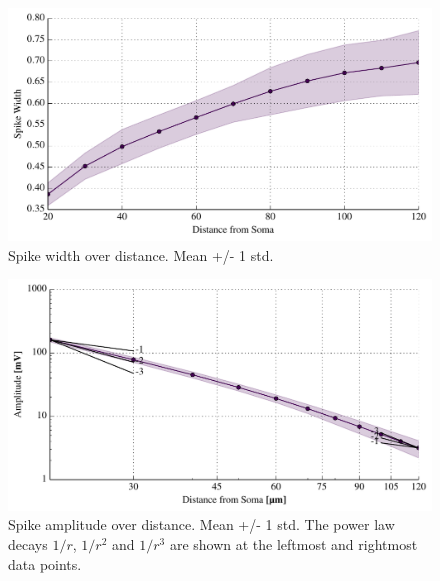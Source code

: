 \documentclass[altfont, fleqn]{uiophd}
\begin{document}
\begin{figure}[thp]
\centering
\includegraphics[width=\textwidth]{images/4_1/disc_spike_width_II.pdf}
\caption{Spike width over distance. Mean +/- 1 std.}
\label{fig:4_1_spike_width}
\end{figure}

\begin{figure}[thp]
    \centering
    \includegraphics[width=\textwidth]{images/4_1/disc_spike_amps_I_log.pdf}
    \caption{Spike amplitude over distance. Mean +/- 1 std. The power law
    decays $1/r$, $1/r^2$ and $1/r^3$ are shown at the leftmost and rightmost
    data points.}
    \label{fig:4_1_spike_amp}
\end{figure}

\newpage
\end{document}

